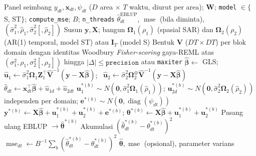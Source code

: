 \documentclass[11pt,a4paper]{article}
\theoremstyle{definition}
\begin{document}
\begin{algorithm}[H]
\caption{\texttt{eblup\_stfh}: EBLUP spasio-temporal + PB-MSE}
\label{alg:stfh}
\begin{algorithmic}[1]
\Require Panel seimbang $y_{dt}, \mathbf{x}_{dt}, \psi_{dt}$ ($D$ area $\times$ $T$ waktu,
  diurut per area); $\mathbf{W}$; \texttt{model} $\in\{$S, ST$\}$;
  \texttt{compute\_mse}; $B$; \texttt{n\_threads}
\Ensure $\hat{\theta}_{dt}^{\text{EBLUP}}$, $\operatorname{mse}$ (bila diminta),
  $(\hat{\sigma}_1^2, \hat{\rho}_1, \hat{\sigma}_2^2[, \hat{\rho}_2])$
\State Susun $\mathbf{y}, \mathbf{X}$; bangun $\boldsymbol{\Omega}_1(\rho_1)$ (spasial SAR)
  dan $\boldsymbol{\Omega}_2(\rho_2)$ (AR(1) temporal, model ST) atau $\mathbf{I}_T$ (model S)
\State Bentuk $\mathbf{V}$ ($DT \times DT$) per blok domain dengan identitas Woodbury
\State \emph{Fisher-scoring} gaya-REML atas $(\sigma_1^2, \rho_1, \sigma_2^2[, \rho_2])$
  hingga $|\Delta| \le \texttt{precision}$ atau \texttt{maxiter}
\State $\hat{\boldsymbol{\beta}} \gets$ GLS; \
  $\hat{\mathbf{u}}_1 \gets \hat{\sigma}_1^2\boldsymbol{\Omega}_1\mathbf{Z}_1^{\top}
  \hat{\mathbf{V}}^{-1}(\mathbf{y} - \mathbf{X}\hat{\boldsymbol{\beta}})$; \
  $\hat{\mathbf{u}}_2 \gets \hat{\sigma}_2^2\boldsymbol{\Omega}_2^{\oplus}
  \hat{\mathbf{V}}^{-1}(\mathbf{y} - \mathbf{X}\hat{\boldsymbol{\beta}})$
\State $\hat{\theta}_{dt} \gets \mathbf{x}_{dt}^{\top}\hat{\boldsymbol{\beta}}
  + \hat{u}_{1d} + \hat{u}_{2dt}$
\If{\texttt{compute\_mse} = TRUE}
  \For{$b = 1, \dots, B$} 
    \State $\mathbf{u}_1^{*(b)} \sim N(\mathbf{0}, \hat{\sigma}_1^2\boldsymbol{\Omega}_1(\hat{\rho}_1))$;
      $\mathbf{u}_{2d}^{*(b)} \sim N(\mathbf{0}, \hat{\sigma}_2^2\boldsymbol{\Omega}_2(\hat{\rho}_2))$
      independen per domain;
      $\mathbf{e}^{*(b)} \sim N(\mathbf{0}, \operatorname{diag}(\psi_{dt}))$
    \State $\mathbf{y}^{*(b)} \gets \mathbf{X}\hat{\boldsymbol{\beta}}
      + \mathbf{u}_1^{*(b)} + \mathbf{u}_2^{*(b)} + \mathbf{e}^{*(b)}$;
      $\boldsymbol{\theta}^{*(b)} \gets \mathbf{X}\hat{\boldsymbol{\beta}}
      + \mathbf{u}_1^{*(b)} + \mathbf{u}_2^{*(b)}$
    \State Pasang ulang EBLUP $\to \hat{\boldsymbol{\theta}}^{*(b)}$
    \State Akumulasi $(\hat{\theta}_{dt}^{*(b)} - \theta_{dt}^{*(b)})^2$
  \EndFor
  \State $\operatorname{mse}_{dt} \gets B^{-1}\sum_b
    (\hat{\theta}_{dt}^{*(b)} - \theta_{dt}^{*(b)})^2$
\EndIf
\State \Return $\hat{\boldsymbol{\theta}}, \operatorname{mse}$ (opsional), parameter varians
\end{algorithmic}
\end{algorithm}
\end{document}
